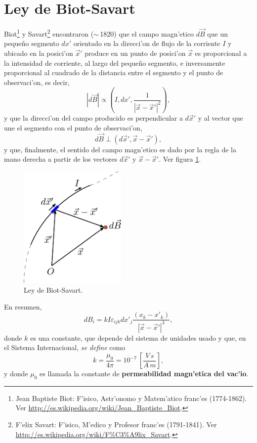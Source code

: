 \section{Ley de Biot-Savart}
Biot\footnote{Jean Baptiste Biot: F'isico, Astr'onomo y Matem'atico franc'es (1774-1862). Ver \url{http://es.wikipedia.org/wiki/Jean_Baptiste_Biot}.} y Savart\footnote{F'elix Savart: F'isico, M'edico y Profesor franc'es (1791-1841). Ver \url{http://es.wikipedia.org/wiki/F\%C3\%A9lix_Savart}.} encontraron ($\sim$\,1820) que el campo magn'etico $d\vec{B}$ que un peque\~no segmento $dx'$ orientado en la direcci'on de flujo de la corriente $I$ y ubicado en la posici'on $\vec{x}'$ produce en un punto de posici'on $\vec{x}$ es proporcional a la intensidad de corriente, al largo del
peque\~no segmento, e inversamente proporcional al cuadrado de la distancia
entre el segmento y el punto de observaci'on, es decir,
\begin{equation}
 \left\vert d\vec{B}\right\vert \propto
\left(I,dx',\frac{1}{\left|\vec{x}-\vec{x}'\right|^2}\right),
\end{equation}
y que la direcci'on del campo producido es perpendicular a $d\vec{x}'$ y al
vector que une el segmento con el punto de observaci'on,
\begin{equation}
d\vec{B}  \perp\left(  d\vec{x}', \vec{x}-\vec{x}' \right) ,
\end{equation}
y que, finalmente, el sentido del campo magn'etico es dado por la regla de la mano derecha a partir de los vectores $d\vec{x}'$ y $\vec{x}-\vec{x}'$. Ver figura \ref{fBS1}. 
\begin{figure}[!h]
\centerline{\includegraphics[height=6cm]{fig/fig-Biot-Savart-01.pdf}}
\label{Esquema para la ley de Biot-Savart.}
\label{fBS1}
\caption{Ley de Biot-Savart.}
\end{figure}
En resumen,
\begin{equation}
dB_i=kI\varepsilon_{ijk}dx'_j\frac{\left(x_k-x'_k\right)}{\left\vert
\vec{x}-\vec{x}'\right\vert^3},
\end{equation}
donde $k$ es una constante, que depende del sistema de unidades usado y que,
en el Sistema Internacional, \textit{se define} como
\begin{equation}
k=\frac{\mu_0}{4\pi}=10^{-7}~\left[  \frac{V\,s}{A\,m}\right],
\end{equation}
y donde $\mu_0$ es llamada la constante de \textbf{permeabilidad magn'etica del vac'io}.

